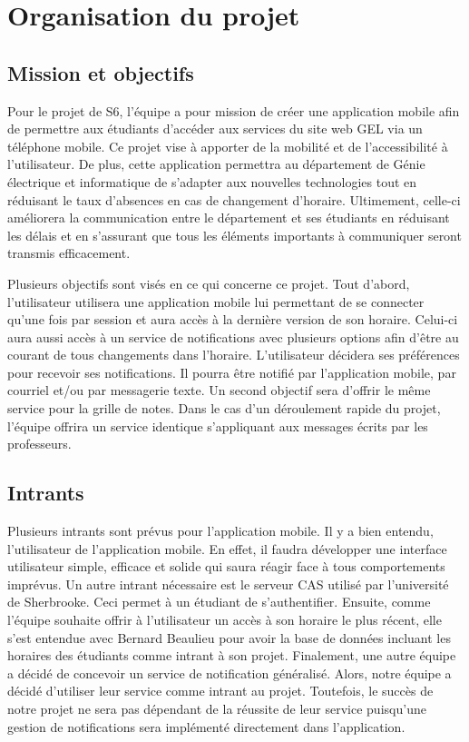 \section{Organisation du projet}
	\subsection{Mission et objectifs}
	Pour le projet de S6, l’équipe a pour mission de créer une application mobile afin de permettre aux étudiants d’accéder aux services du site web GEL via un téléphone mobile. Ce projet vise à apporter de la mobilité et de l’accessibilité à l’utilisateur. De plus, cette application permettra au département de Génie électrique et informatique de s’adapter aux nouvelles technologies tout en réduisant le taux d’absences en cas de changement d’horaire. Ultimement, celle-ci améliorera la communication entre le département et ses étudiants en réduisant les délais et en s’assurant que tous les éléments importants à communiquer seront transmis efficacement.

	Plusieurs objectifs sont visés en ce qui concerne ce projet. Tout d’abord, l’utilisateur utilisera une application mobile lui permettant de se connecter qu’une fois par session et aura accès à la dernière version de son horaire. Celui-ci aura aussi accès à un service de notifications avec plusieurs options afin d’être au courant de tous changements dans l’horaire. L’utilisateur décidera ses préférences pour recevoir ses notifications. Il pourra être notifié par l’application mobile, par courriel et/ou par messagerie texte. Un second objectif sera d’offrir le même service pour la grille de notes. Dans le cas d’un déroulement rapide du projet, l’équipe offrira un service identique s’appliquant aux messages écrits par les professeurs.
	
	\subsection{Intrants}
	Plusieurs intrants sont prévus pour l’application mobile. Il y a bien entendu, l’utilisateur de l’application mobile. En effet, il faudra développer une interface utilisateur simple, efficace et solide qui saura réagir face à tous comportements imprévus. Un autre intrant nécessaire est le serveur CAS utilisé par l’université de Sherbrooke. Ceci permet à un étudiant de s’authentifier. Ensuite, comme l’équipe souhaite offrir à l’utilisateur un accès à son horaire le plus récent, elle s’est entendue avec Bernard Beaulieu pour avoir la base de données incluant les horaires des étudiants comme intrant à son projet. Finalement, une autre équipe a décidé de concevoir un service de notification généralisé. Alors, notre équipe a décidé d’utiliser leur service comme intrant au projet. Toutefois, le succès de notre projet ne sera pas dépendant de la réussite de leur service puisqu’une gestion de notifications sera implémenté directement dans l’application.

